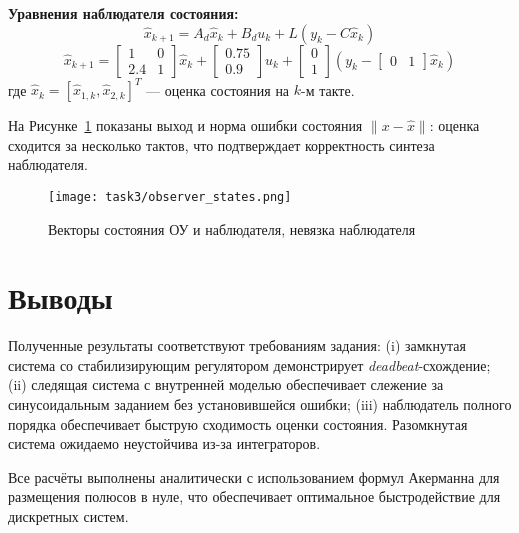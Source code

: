 \textbf{Уравнения наблюдателя состояния:}
\[
\hat x_{k+1} = A_d \hat x_k + B_d u_k + L(y_k - C\hat x_k)
\]
\[
\hat x_{k+1} = \begin{bmatrix}1 & 0\\ 2.4 & 1\end{bmatrix} \hat x_k + \begin{bmatrix}0.75\\ 0.9\end{bmatrix} u_k + \begin{bmatrix}0\\ 1\end{bmatrix} (y_k - \begin{bmatrix}0 & 1\end{bmatrix} \hat x_k)
\]
где $\hat x_k = [\hat x_{1,k}, \hat x_{2,k}]^T$ — оценка состояния на $k$-м такте.

На Рисунке~\ref{fig:task3_obs} показаны выход и норма ошибки состояния $\lVert x-\hat x\rVert$: оценка сходится за несколько тактов, что подтверждает корректность синтеза наблюдателя.

\begin{figure}[H]
    \centering
    \texttt{[image: task3/observer\_states.png]}
    \caption{Векторы состояния ОУ и наблюдателя, невязка наблюдателя}
    \label{fig:task3_obs}
\end{figure}

\section{Выводы}
Полученные результаты соответствуют требованиям задания: (i) замкнутая система со стабилизирующим регулятором демонстрирует \textit{deadbeat}-схождение; (ii) следящая система с внутренней моделью обеспечивает слежение за синусоидальным заданием без установившейся ошибки; (iii) наблюдатель полного порядка обеспечивает быструю сходимость оценки состояния. Разомкнутая система ожидаемо неустойчива из-за интеграторов.

Все расчёты выполнены аналитически с использованием формул Акерманна для размещения полюсов в нуле, что обеспечивает оптимальное быстродействие для дискретных систем.



